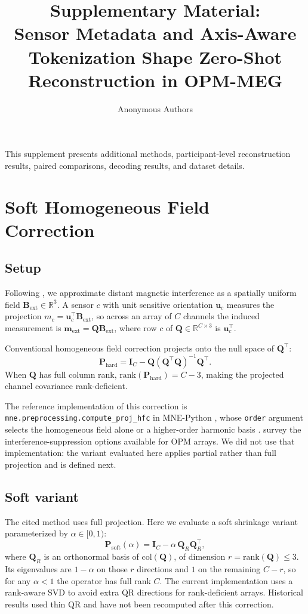 \documentclass[letterpaper]{article}
\title{Supplementary Material:\\Sensor Metadata and Axis-Aware Tokenization Shape Zero-Shot Reconstruction in OPM-MEG}
\author{Anonymous Authors}
\begin{document}
\maketitle

\noindent
This supplement presents additional methods, participant-level reconstruction results,
paired comparisons, decoding results, and dataset details.

\section{Soft Homogeneous Field Correction}

\subsection{Setup}
Following \citet{tierney2021hfc}, we approximate distant magnetic interference as a spatially uniform field $\mathbf{B}_{\mathrm{ext}} \in \mathbb{R}^{3}$. A sensor $c$ with unit
sensitive orientation $\mathbf{u}_{c}$ measures the projection
$m_{c} = \mathbf{u}_{c}^{\top}\mathbf{B}_{\mathrm{ext}}$, so across an array of $C$
channels the induced measurement is $\mathbf{m}_{\mathrm{ext}} = \mathbf{Q}\mathbf{B}_{\mathrm{ext}}$,
where row $c$ of $\mathbf{Q} \in \mathbb{R}^{C \times 3}$ is $\mathbf{u}_{c}^{\top}$.

Conventional homogeneous field correction \citep{tierney2021hfc} projects onto the null space of
$\mathbf{Q}^{\top}$:
\[
\mathbf{P}_{\mathrm{hard}} = \mathbf{I}_{C} - \mathbf{Q}(\mathbf{Q}^{\top}\mathbf{Q})^{-1}\mathbf{Q}^{\top}.
\]
When $\mathbf{Q}$ has full column rank, $\mathrm{rank}(\mathbf{P}_{\mathrm{hard}}) = C - 3$, making the projected channel covariance rank-deficient.

The reference implementation of this correction is \texttt{mne.preprocessing.compute\_proj\_hfc} in MNE-Python \citep{mneopmtutorial}, whose \texttt{order} argument selects the homogeneous field alone or a higher-order harmonic basis \citep{tierney2022harmonic}. \citet{seymour2022interference} survey the interference-suppression options available for OPM arrays. We did not use that implementation: the variant evaluated here applies partial rather than full projection and is defined next.

\subsection{Soft variant}
The cited method uses full projection. Here we evaluate a soft shrinkage variant parameterized by $\alpha \in [0,1)$:
\[
\mathbf{P}_{\mathrm{soft}}(\alpha) = \mathbf{I}_{C} - \alpha\,\mathbf{Q}_{R}\mathbf{Q}_{R}^{\top},
\]
where $\mathbf{Q}_{R}$ is an orthonormal basis of $\mathrm{col}(\mathbf{Q})$, of dimension $r=\mathrm{rank}(\mathbf{Q})\leq 3$. Its eigenvalues are $1-\alpha$ on those $r$ directions and $1$ on the remaining $C-r$, so for any $\alpha < 1$ the operator has full rank $C$. The current implementation uses a rank-aware SVD to avoid extra QR directions for rank-deficient arrays. Historical results used thin QR and have not been recomputed after this correction.
\end{document}
